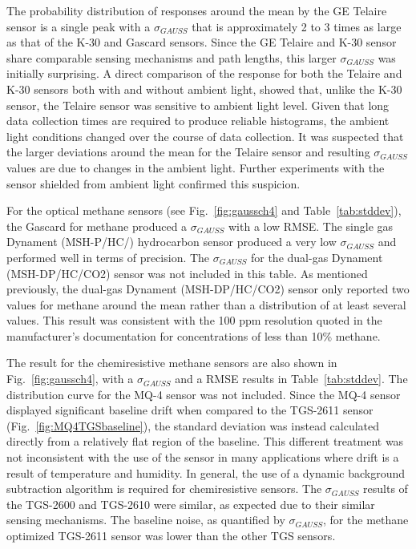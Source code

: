 \documentclass[sensors,article,submit,moreauthors,pdftex]{Definitions/mdpi}
\begin{document}
			
			The probability distribution of responses around the mean by the GE Telaire sensor is a single peak with a $\sigma_{GAUSS}$ that is approximately 2 to 3 times as large as that of the K-30 and Gascard sensors.
			Since the GE Telaire and K-30 sensor share comparable sensing mechanisms and path lengths, this larger $\sigma_{GAUSS}$ was initially surprising.
			A direct comparison of the response for both the Telaire and K-30 sensors both with and without ambient light, showed that, unlike the K-30 sensor, the Telaire sensor was sensitive to ambient light level.
			Given that long data collection times are required to produce reliable histograms, the ambient light conditions changed over the course of data collection.
			It was suspected that the larger deviations around the mean for the Telaire sensor and resulting $\sigma_{GAUSS}$ values are due to changes in the ambient light.
			Further experiments with the sensor shielded from ambient light confirmed this suspicion.
			
			
			For the optical methane sensors (see Fig.~\ref{fig:gaussch4} and Table~\ref{tab:stddev}), the Gascard for methane produced a $\sigma_{GAUSS}$ with a low RMSE. The single gas Dynament (MSH-P/HC/) hydrocarbon sensor produced a very low $\sigma_{GAUSS}$ and performed well in terms of precision.
			The $\sigma_{GAUSS}$ for the dual-gas Dynament (MSH-DP/HC/CO2) sensor was not included in this table.
			As mentioned previously, the dual-gas Dynament (MSH-DP/HC/CO2) sensor only reported two values for methane around the mean rather than a distribution of at least several values.
			This result was consistent with the 100 ppm resolution quoted in the manufacturer's documentation for concentrations of less than 10\% methane.
			

			The result for the chemiresistive methane sensors are also shown in Fig.~\ref{fig:gaussch4}, with a $\sigma_{GAUSS}$ and a RMSE results in Table~\ref{tab:stddev}.
			The distribution curve for the MQ-4 sensor was not included.
			Since the MQ-4 sensor displayed significant baseline drift when compared to the TGS-2611 sensor (Fig.~\ref{fig:MQ4TGSbaseline}), the standard deviation was instead calculated directly from a relatively flat region of the baseline.
			This different treatment was not inconsistent with the use of the sensor in many applications where drift is a result of temperature and humidity.
			 In general, the use of a dynamic background subtraction algorithm is required for chemiresistive sensors.
			The $\sigma_{GAUSS}$ results of the TGS-2600 and TGS-2610 were similar, as expected due to their similar sensing mechanisms.
			The baseline noise, as quantified by $\sigma_{GAUSS}$, for the methane optimized TGS-2611 sensor was lower than the other TGS sensors.
			
\end{document}
